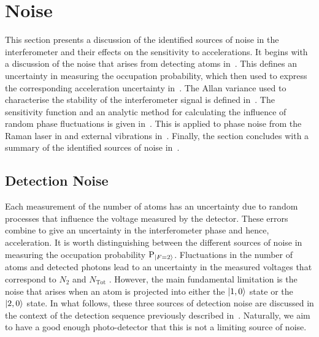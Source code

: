 \section{Noise}\label{sec:atomint_sensitivity}
This section presents a discussion of the identified sources of
noise in the interferometer and their effects on the sensitivity to
accelerations. It begins with a discussion of the noise that arises
from detecting atoms in~. This
defines an uncertainty in measuring the occupation probability, which then used to
express the corresponding acceleration uncertainty
in~. The Allan variance used to characterise
the stability of the interferometer signal is defined
in~. The sensitivity function and an analytic method
for calculating the influence of random phase fluctuations is given
in~. This is applied to phase noise from
the Raman laser in  and external
vibrations in~. Finally, the
section concludes with a summary of the identified sources of noise
in~.
\subsection{Detection Noise}\label{subsec:detection_noise}

Each measurement of the number of atoms has an uncertainty due to
random processes that influence the voltage measured by the detector. These errors
combine to give an uncertainty in the interferometer phase and
hence, acceleration. It is worth distinguishing between the different
sources of noise in measuring the occupation probability
$\text{P}_{\ket{F=2}}$. Fluctuations in the number of atoms and detected
photons lead to an uncertainty in the measured voltages that
correspond to $N_2$ and $N_\text{Tot}$ 
\nocite{Rocco2014}. However, the main fundamental limitation
is the noise that arises when an atom is projected into either the
$\ket{1,0}$ state or the $\ket{2,0}$ state. In what follows, these
three sources of detection noise are discussed in the context of the
detection sequence previously described
in~. Naturally, we aim to have a
good enough photo-detector that this is not a limiting source of
noise.
